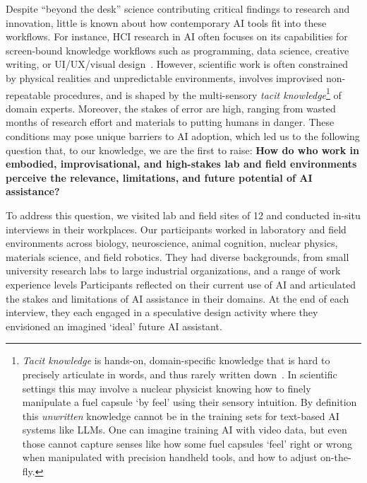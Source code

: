 Despite ``beyond the desk'' science contributing critical findings to research and innovation, little is known about how contemporary AI tools fit into these workflows. For instance, HCI research in AI often focuses on its capabilities for screen-bound knowledge workflows such as programming, data science, creative writing, or UI/UX/visual design~\cite{guo2025from, laban2024beyond,vaithilingam2022expectation, zheng2025towards, liu2023code,shi2023understanding, suh2024luminate}. However, scientific work is often constrained by physical realities and unpredictable environments, involves improvised non-repeatable procedures, and is shaped by the multi-sensory \emph{tacit knowledge}\footnote{\emph{Tacit knowledge} is hands-on, domain-specific knowledge that is hard to precisely articulate in words, and thus rarely written down~\cite{polanyi2009tacit}. In scientific settings this may involve a nuclear physicist knowing how to finely manipulate a fuel capsule `by feel' using their sensory intuition. By definition this \emph{unwritten} knowledge cannot be in the training sets for text-based AI systems like LLMs. One can imagine training AI with video data, but even those cannot capture senses like how some fuel capsules `feel' right or wrong when manipulated with precision handheld tools, and how to adjust on-the-fly.} of domain experts. Moreover, the stakes of error are high, ranging from wasted months of research effort and materials to putting humans in danger. These conditions may pose unique barriers to AI adoption, which led us to the following question that, to our knowledge, we are the first to raise: \textbf{How do  who work in embodied, improvisational, and high-stakes lab and field environments perceive the relevance, limitations, and future potential of AI assistance?}

To address this question, we visited lab and field sites of 12  and conducted in-situ interviews in their workplaces. Our participants worked in laboratory and field environments across biology, neuroscience, animal cognition, nuclear physics, materials science, and field robotics. They had diverse backgrounds, from small university research labs to large industrial organizations, and a range of work experience levels  Participants reflected on their current use of AI and articulated the stakes and limitations of AI assistance in their domains. At the end of each interview, they each engaged in a speculative design activity where they envisioned an imagined `ideal' future AI assistant.

